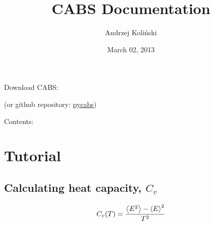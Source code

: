 \documentclass[letterpaper,10pt,english]{sphinxmanual}
\title{CABS Documentation}
\date{March 02, 2013}
\author{Andrzej Koliński}
\begin{document}
\maketitle
\tableofcontents
{}\label{index::doc}


Download CABS:

 (or github repository: \href{https://github.com/mjamroz/pycabs}{pycabs})

Contents:


\chapter{Tutorial}
\label{tutorial::doc}\label{tutorial:tutorial}\label{tutorial:welcome-to-cabs-s-webpage}

\section{Calculating heat capacity, $C_v$}
\label{tutorial:calculating-heat-capacity}\begin{gather}
\begin{split}C_v(T) = \frac{\left<E^2\right> - \left<E\right>^2}{T^2}\end{split}\notag\\\begin{split}\end{split}\notag
\end{gather}
\end{document}
